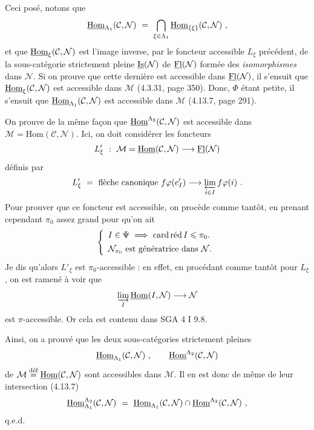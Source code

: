 
Ceci posé, notons que
\[
\uHom_{\Lambda_1}(\mathcal{C},\mathcal{N}) \ = \ \bigcap_{\xi\in\Lambda_1} \uHom_{\{\xi\}}(\mathcal{C},\mathcal{N}) \ ,
\]
et que $\uHom_\xi(\mathcal{C},\mathcal{N})$ est l'image inverse, par le foncteur accessible $L_\xi$ précédent, de la sous-catégorie strictement pleine $\uIs(\mathcal{N})$ de $\uFl(\mathcal{N})$ formée des \textit{isomorphismes} dans $\mathcal{N}$. Si on prouve que cette dernière est accessible dans $\uFl(\mathcal{N})$, il s'ensuit que
$\uHom_\xi(\mathcal{C},\mathcal{N})$ est accessible dans $\mathcal{M}$ (4.3.31, page 350). Donc, $\Phi$ étant petite, il s'ensuit que $\uHom_{\Lambda_1}(\mathcal{C},\mathcal{N})$ est accessible dans $\mathcal{M}$ (4.13.7, page 291).

On prouve de la même façon que $\uHom^{\Lambda_2}(\mathcal{C},\mathcal{N})$ est accessible dans $\mathcal{M} = \mathrm{Hom}(\mathcal{C},\mathcal{N})$. Ici, on doit considérer les foncteurs %
\[
L'_\xi \ : \ \mathcal{M} = \uHom(\mathcal{C},\mathcal{N}) \longrightarrow \uFl(\mathcal{N})
\]
définis par
\[
L'_\xi \ = \ \text{flèche canonique } f\varphi(e'_I) \longrightarrow \varprojlim_{i\in I} f\varphi(i) \ .
\]
Pour prouver que ce foncteur est accessible, on procède comme tantôt, en prenant cependant $\pi_0$ assez grand pour qu'on ait
\[
\left\{
\begin{array}{l}
I \in \Psi \ \Longrightarrow \ \cardred I \leqslant \pi_0. \\[1ex]
\mathcal{N}_{\pi_0} \text{ est génératrice dans } \mathcal{N}.
\end{array}
\right.
\]
Je dis qu'alors $L'_\xi$ est $\pi_0$-accessible : en effet, en procédant comme tantôt pour $L_\xi$, on est ramené à voir que
\[
\varinjlim_{I} \uHom(I,\mathcal{N}) \longrightarrow \mathcal{N}
\]
est $\pi$-accessible. Or cela est contenu dans SGA 4 I 9.8.

Ainsi, on a prouvé que les deux sous-catégories strictement pleines
\[
\uHom_{\Lambda_1}(\mathcal{C},\mathcal{N}) \ , \qquad \uHom^{\Lambda_2}(\mathcal{C},\mathcal{N})
\]
de $\mathcal{M} \defeq \uHom(\mathcal{C},\mathcal{N})$ sont accessibles dans $\mathcal{M}$. Il en est donc de même de leur intersection (4.13.7)
\[
\uHom^{\Lambda_2}_{\Lambda_1}(\mathcal{C},\mathcal{N}) \ = \ \uHom_{\Lambda_1}(\mathcal{C},\mathcal{N}) \cap \uHom^{\Lambda_2}(\mathcal{C},\mathcal{N}) \ ,
\]
q.e.d.

